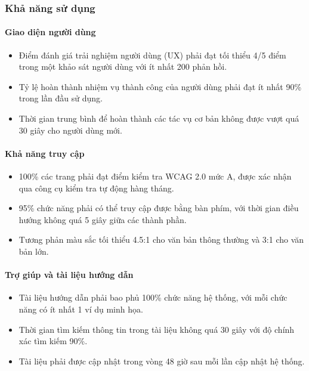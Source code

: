 \subsubsection{Khả năng sử dụng}

\paragraph{Giao diện người dùng}
\begin{itemize}
    \item Điểm đánh giá trải nghiệm người dùng (UX) phải đạt tối thiểu 4/5 điểm trong một khảo sát người dùng với ít nhất 200 phản hồi. 
    \item Tỷ lệ hoàn thành nhiệm vụ thành công của người dùng phải đạt ít nhất 90\% trong lần đầu sử dụng. 
    \item Thời gian trung bình để hoàn thành các tác vụ cơ bản không được vượt quá 30 giây cho người dùng mới.
\end{itemize}

\paragraph{Khả năng truy cập}
\begin{itemize}
    \item 100\% các trang phải đạt điểm kiểm tra WCAG 2.0 mức A, được xác nhận qua công cụ kiểm tra tự động hàng tháng. 
    \item 95\% chức năng phải có thể truy cập được bằng bàn phím, với thời gian điều hướng không quá 5 giây giữa các thành phần. 
    \item Tương phản màu sắc tối thiểu 4.5:1 cho văn bản thông thường và 3:1 cho văn bản lớn.
\end{itemize}

\paragraph{Trợ giúp và tài liệu hướng dẫn}
\begin{itemize}
    \item Tài liệu hướng dẫn phải bao phủ 100\% chức năng hệ thống, với mỗi chức năng có ít nhất 1 ví dụ minh họa. 
    \item Thời gian tìm kiếm thông tin trong tài liệu không quá 30 giây với độ chính xác tìm kiếm 90\%. 
    \item Tài liệu phải được cập nhật trong vòng 48 giờ sau mỗi lần cập nhật hệ thống.
\end{itemize}

